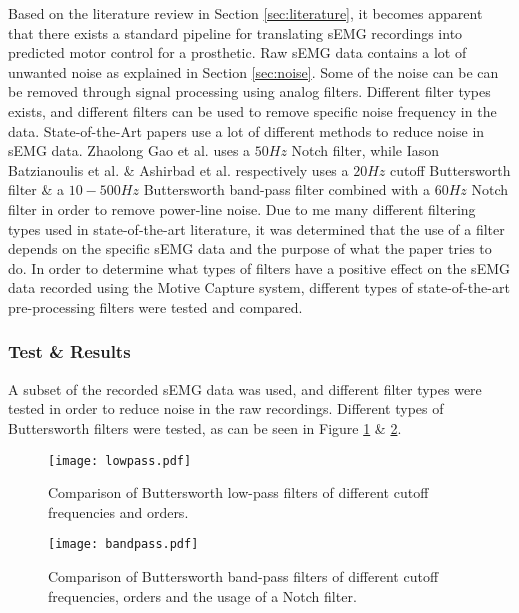 \documentclass[../main.tex]{subfiles}
\begin{document}
Based on the literature review in Section \ref{sec:literature}, it becomes apparent that there exists a standard pipeline for translating sEMG recordings into predicted motor control for a prosthetic.
Raw sEMG data contains a lot of unwanted noise as explained in Section \ref{sec:noise}.
Some of the noise can be can be removed through signal processing using analog filters.
Different filter types exists, and different filters can be used to remove specific noise frequency in the data. 
State-of-the-Art papers use a lot of different methods to reduce noise in sEMG data.
Zhaolong Gao et al. \cite{Zhaolong2021} uses a $50Hz$ Notch filter, while Iason Batzianoulis et al. \cite{Batzianoulis2018} \& Ashirbad et al. \cite{ashirbad2022} respectively uses a $20Hz$ cutoff Buttersworth filter \& a $10-500Hz$  Buttersworth band-pass filter combined with a $60Hz$ Notch filter in order to remove power-line noise.
Due to me many different filtering types used in state-of-the-art literature, it was determined that the use of a filter depends on the specific sEMG data and the purpose of what the paper tries to do.
In order to determine what types of filters have a positive effect on the sEMG data recorded using the Motive Capture system, different types of state-of-the-art pre-processing filters were tested and compared.


\subsubsection{Test \& Results}

A subset of the recorded sEMG data was used, and different filter types were tested in order to reduce noise in the raw recordings.
Different types of Buttersworth filters were tested, as can be seen in Figure \ref{fig:lowpass} \& \ref{fig:bandpass}.

\begin{figure}[H]
\begin{center}
\texttt{[image: lowpass.pdf]}
\caption{Comparison of Buttersworth low-pass filters of different cutoff frequencies and orders.}
\label{fig:lowpass}
\end{center}
\end{figure}
\begin{figure}[H]
\begin{center}
\texttt{[image: bandpass.pdf]}
\caption{Comparison of Buttersworth band-pass filters of different cutoff frequencies, orders and the usage of a Notch filter.}
\label{fig:bandpass}
\end{center}
\end{figure}
\end{document}
